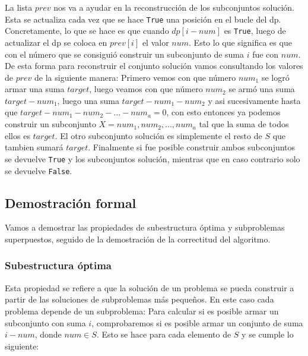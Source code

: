 \documentclass[11pt]{article}
\begin{document}
    La lista $prev$ nos va a ayudar en la reconstrucción de los subconjuntos solución. Esta se actualiza cada vez que se hace \texttt{True}
    una posición en el bucle del dp. Concretamente, lo que se hace es que cuando $dp[i - num]$ es \texttt{True}, luego de actualizar el dp
    se coloca en $prev[i]$ el valor $num$. Esto lo que significa es que con el número que se consiguió construir un subconjunto de suma $i$
    fue con $num$. De esta forma para reconstruir el conjunto solución vamos consultando los valores de $prev$ de la siguiente manera:
    Primero vemos con que número $num_1$ se logró armar una suma $target$, luego veamos con que número $num_2$ se armó una suma $target-num_1$,
    luego una suma $target-num_1-num_2$ y asi sucesivamente hasta que $target-num_1-num_2-...-num_a = 0$, con esto entonces ya podemos construir
    un subconjunto $X = num_1, num_2, ... , num_a$ tal que la suma de todos ellos es $target$. El otro subconjunto solución es simplemente el resto
    de $S$ que tambien sumará $target$. Finalmente si fue posible construir ambos subconjuntos se devuelve \texttt{True} y los subconjuntos
    solución, mientras que en caso contrario solo se devuelve \texttt{False}.

    \subsection{Demostración formal}
    Vamos a demostrar las propiedades de subestructura óptima y subproblemas superpuestos, seguido de la demostración
    de la correctitud del algoritmo.

    \subsubsection{Subestructura óptima}
    Esta propiedad se refiere a que la solución de un problema se pueda construir a partir de las soluciones de subproblemas más pequeños.
    En este caso cada problema depende de un subproblema: Para calcular si es posible armar un subconjunto con suma $i$, comprobaremos si es
    posible armar un conjunto de suma $i-num$, donde $num \in S$. Esto se hace para cada elemento de $S$ y se cumple lo siguiente:
\end{document}
